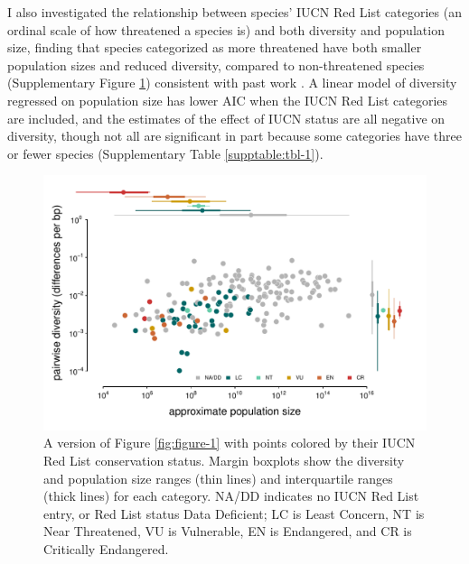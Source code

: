 \documentclass[11pt]{article}
\begin{document}
I also investigated the relationship between species' IUCN Red List categories
(an ordinal scale of how threatened a species is) and both diversity and
population size, finding that species categorized as more threatened have both
smaller population sizes and reduced diversity, compared to non-threatened
species (Supplementary Figure \ref{suppfig:figure-1-redlist}) consistent with
past work \parencite{Spielman2004-mt}. A linear model of diversity regressed on
population size has lower AIC when the IUCN Red List categories are included,
and the estimates of the effect of IUCN status are all negative on diversity,
though not all are significant in part because some categories have three or
fewer species (Supplementary Table \ref{supptable:tbl-1}).

\begin{figure}[t!]
  \centering
  \includegraphics[width=\textwidth]{figures/diversity_popsize_redlist.pdf}

  \caption{A version of Figure \ref{fig:figure-1} with points colored by their
    IUCN Red List conservation status. Margin boxplots show the diversity and
    population size ranges (thin lines) and interquartile ranges (thick lines)
    for each category. NA/DD indicates no IUCN Red List entry, or Red List
  status Data Deficient; LC is Least Concern, NT is Near Threatened, VU is
Vulnerable, EN is Endangered, and CR is Critically Endangered.}

  \label{suppfig:figure-1-redlist}
\end{figure}
\end{document}
